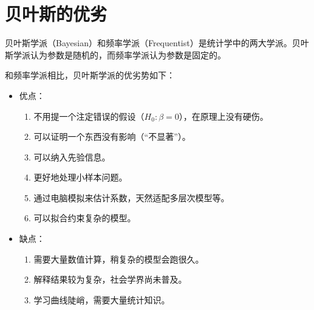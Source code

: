 \documentclass[UTF8]{ctexart}
\begin{document}
\section{贝叶斯的优劣}

贝叶斯学派（Bayesian）和频率学派（Frequentist）是统计学中的两大学派。贝叶斯学派认为参数是随机的，而频率学派认为参数是固定的。

和频率学派相比，贝叶斯学派的优劣势如下：

\begin{itemize}
	\item 优点：
	      \begin{enumerate}
		      \item 不用提一个注定错误的假设（$H_0: \beta = 0$），在原理上没有硬伤。
		      \item 可以证明一个东西没有影响（“不显著”）。
		      \item 可以纳入先验信息。
		      \item 更好地处理小样本问题。
		      \item 通过电脑模拟来估计系数，天然适配多层次模型等。
		      \item 可以拟合约束复杂的模型。
	      \end{enumerate}
	\item 缺点：
	      \begin{enumerate}
		      \item 需要大量数值计算，稍复杂的模型会跑很久。
		      \item 解释结果较为复杂，社会学界尚未普及。
		      \item 学习曲线陡峭，需要大量统计知识。
	      \end{enumerate}
\end{itemize}
\end{document}
